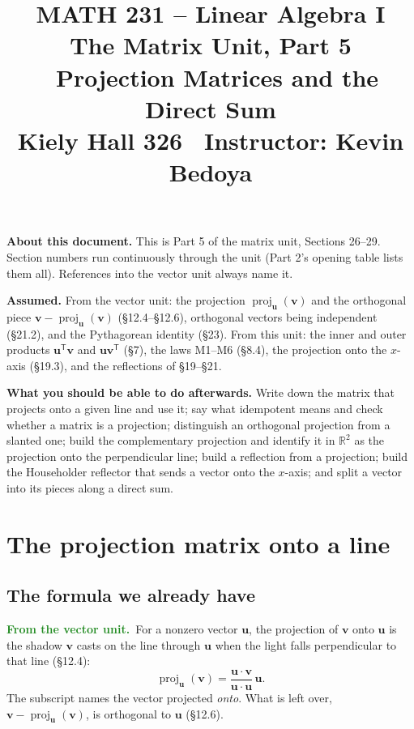 \documentclass[11pt]{article}
\title{\vspace{-1.2cm}\textbf{\sffamily MATH 231 -- Linear Algebra I}\\[4pt]
       {\large\sffamily The Matrix Unit, Part 5 \textbullet\ Projection
        Matrices and the Direct Sum}\\[2pt]
       {\normalsize\sffamily Kiely Hall 326 \textbullet\
        Instructor: Kevin Bedoya}}
\author{}
\date{}
\theoremstyle{plain}
\theoremstyle{definition}
\theoremstyle{remark}
\newcommand{\lookback}[1][the vector unit]{\par\smallskip\noindent
  \textbf{\sffamily\textcolor{ForestGreen}{From #1.}}\ \ignorespaces}
\newcommand{\R}{\mathbb{R}}
\newcommand{\vc}[1]{\mathbf{#1}}
\newcommand{\T}{^{\mathsf{T}}}
\newcommand{\proj}[2]{\operatorname{proj}_{#1}(#2)}
\begin{document}
\setcounter{section}{25}  %
\maketitle
\vspace{-1.6cm}

\noindent\textbf{About this document.} This is Part 5 of the matrix unit,
Sections 26--29. Section numbers run continuously through the unit (Part 2's
opening table lists them all). References into the vector unit always name it.

\medskip
\noindent\textbf{Assumed.} From the vector unit: the projection
$\proj{\vc{u}}{\vc{v}}$ and the orthogonal piece $\vc{v}-\proj{\vc{u}}{\vc{v}}$
(\S12.4--\S12.6), orthogonal vectors being independent (\S21.2), and the
Pythagorean identity (\S23). From this unit: the inner and outer products
$\vc{u}\T\vc{v}$ and $\vc{u}\vc{v}\T$ (\S7), the laws M1--M6 (\S8.4), the
projection onto the $x$-axis (\S19.3), and the reflections of \S19--\S21.

\medskip
\noindent\textbf{What you should be able to do afterwards.} Write down the
matrix that projects onto a given line and use it; say what idempotent means and
check whether a matrix is a projection; distinguish an orthogonal projection
from a slanted one; build the complementary projection and identify it in
$\R^{2}$ as the projection onto the perpendicular line; build a reflection from
a projection; build the Householder reflector that sends a vector onto the
$x$-axis; and split a vector into its pieces along a direct sum.

\section{The projection matrix onto a line}

\subsection{The formula we already have}
\lookback For a nonzero vector $\vc{u}$, the projection of $\vc{v}$ onto
$\vc{u}$ is the shadow $\vc{v}$ casts on the line through $\vc{u}$ when the
light falls perpendicular to that line (\S12.4):
\[
  \proj{\vc{u}}{\vc{v}}=\frac{\vc{u}\cdot\vc{v}}{\vc{u}\cdot\vc{u}}\,\vc{u}.
\]
The subscript names the vector projected \emph{onto}. What is left over,
$\vc{v}-\proj{\vc{u}}{\vc{v}}$, is orthogonal to $\vc{u}$ (\S12.6).
\end{document}
